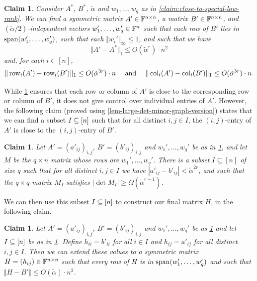 \documentclass{daj}
\theoremstyle{plain}
\theoremstyle{plain}
\theoremstyle{plain}
\theoremstyle{plain}
\theoremstyle{definition}
\theoremstyle{plain}
\theoremstyle{plain}
\theoremstyle{definition}
\theoremstyle{definition}
\theoremstyle{plain}
\newtheorem{claim}[thm]{Claim}
\begin{document}
\begin{claim}\label{claim:zero-some-columns}
Consider $A^*$, $B^*$, $\tilde\alpha$ and $w_1,\dots,w_q$ as in \cref{claim:close-to-special-low-rank}. We can find a symmetric matrix $A'\in \mathbb{F}^{n\times n}$, a matrix $B'\in \mathbb{F}^{n\times n}$, and $(\tilde \alpha/2)$-independent vectors $w_1',\dots,w_q'\in \mathbb{F}^n$ such that each row of $B'$ lies in $\operatorname{span}(w_1',\dots,w_q')$, such that each $\Vert w_i'\Vert_\infty\le 1$, and such that we have
\[\Vert A'-A^*\Vert_1\le O(\tilde \alpha^{r})\cdot n^2\]
and, for each $i\in [n]$, 
\[\Vert \operatorname{row}_i(A')-\operatorname{row}_i(B')\Vert_1\le O(\tilde{\alpha}^{3r})\cdot n \quad\text{ and }\quad\Vert \operatorname{col}_i(A')-\operatorname{col}_i(B')\Vert_1 \le O(\tilde{\alpha}^{3r})\cdot n.\]
\end{claim}

While \cref{claim:zero-some-columns} ensures that each row or column of $A'$ is close to the corresponding row or column of $B'$, it does not give control over individual entries of $A'$. However, the following claim (proved using \cref{lem-large-det-minor-graph-version}) states that we can find a subset $I\subseteq [n]$ such that for all distinct $i,j\in I$, the $(i,j)$-entry of $A'$ is close to the $(i,j)$-entry of $B'$.

\begin{claim}\label{claim:graph-lemma-application}
Let $A'=(a'_{ij})_{i,j}$, $B'=(b'_{ij})_{i,j}$ and $w_1',\dots,w_q'$ be as in \cref{claim:zero-some-columns}, and let $M$ be the $q\times n$ matrix whose rows are $w_1',\dots,w_q'$. There is a subset $I\subseteq [n]$ of size $q$ such that for all distinct $i,j\in I$ we have $|a'_{ij}-b'_{ij}|<\tilde \alpha^{2r}$, and such that the $q\times q$ matrix $M_I$ satisfies $|\det M_I|\ge \Omega(\tilde \alpha^{r-1})$.
\end{claim}

We can then use this subset $I\subseteq [n]$ to construct our final matrix $H$, in the following claim.

\begin{claim}\label{claim:final-symmetric}
Let $A'=(a'_{ij})_{i,j}$, $B'=(b'_{ij})_{i,j}$ and $w_1',\dots,w_q'$ be as \cref{claim:zero-some-columns} and let $I\subseteq [n]$ be as in \cref{claim:graph-lemma-application}. Define $h_{ii}=b'_{ii}$ for all $i\in I$ and $h_{ij}=a'_{ij}$ for all distinct $i,j\in I$. Then we can extend these values to a symmetric matrix $H=(h_{ij})\in \mathbb{F}^{n\times n}$ such that every row of $H$ is in $\operatorname{span}(w_1',\dots,w_q')$ and such that $\Vert H-B'\Vert\le  O(\tilde\alpha)\cdot n^2$.
\end{claim}
\end{document}
